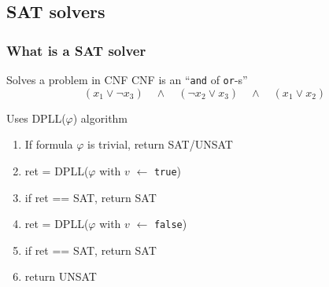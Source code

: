 \documentclass[xcolor=usenames,xcolor=svgnames,table,slidestop,compress,mathserif]{beamer}
\begin{document}
\subsection{SAT solvers}
\frame
{
\frametitle{What is a SAT solver}
\begin{beamerboxesrounded}[shadow=true]{Solves a problem in CNF}
CNF is an ``\texttt{and} of \texttt{or}-s''
\begin{displaymath}
   (x_1 \vee \neg x_3)  \quad \wedge \quad (\neg x_2 \vee x_3) \quad \wedge \quad (x_1 \vee x_2)
\end{displaymath}
\end{beamerboxesrounded}

\smallskip
\begin{beamerboxesrounded}[shadow=true]{Uses DPLL($\varphi$) algorithm}
  \begin{enumerate}
  \small
   \item If formula $\varphi$ is trivial, return SAT/UNSAT
   \item ret = DPLL($\varphi$ with $v$ $\leftarrow$ \texttt{true})
   \item if ret == SAT, return SAT
   \item ret = DPLL($\varphi$ with $v$ $\leftarrow$ \texttt{false})
   \item if ret == SAT, return SAT
   \item return UNSAT
 \end{enumerate}
 \end{beamerboxesrounded}
}
\end{document}
